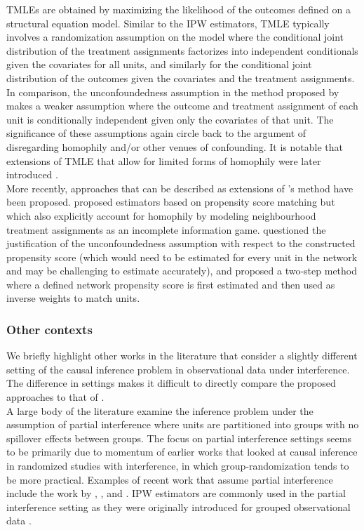 \documentclass[10pt]{article}
\begin{document}
TMLEs are obtained by maximizing the likelihood of the outcomes defined on a structural equation model. Similar to the IPW estimators, TMLE typically involves a randomization assumption \parencite{VanDerLaan:2014} on the model where the conditional joint distribution of the treatment assignments factorizes into independent conditionals given the covariates for all units, and similarly for the conditional joint distribution of the outcomes given the covariates and the treatment assignments. In comparison, the unconfoundedness assumption in the method proposed by \textcite{Forastiere:2021} makes a weaker assumption where the outcome and treatment assignment of each unit is conditionally independent given only the covariates of that unit. The significance of these assumptions again circle back to the argument of disregarding homophily and/or other venues of confounding. It is notable that extensions of TMLE that allow for limited forms of homophily were later introduced \parencite{Ogburn:2017}.
\\

More recently, approaches that can be described as extensions of \textcite{Forastiere:2021}'s method have been proposed. \textcite{Jackson:2020} proposed estimators based on propensity score matching but which also explicitly account for homophily by modeling neighbourhood treatment assignments as an incomplete information game. \textcite{Sanchez:2021} questioned the justification of the unconfoundedness assumption with respect to the constructed propensity score (which would need to be estimated for every unit in the network and may be challenging to estimate accurately), and proposed a two-step method where a defined network propensity score is first estimated and then used as inverse weights to match units.

\subsubsection{Other contexts}

We briefly highlight other works in the literature that consider a slightly different setting of the causal inference problem in observational data under interference. The difference in settings makes it difficult to directly compare the proposed approaches to that of \textcite{Forastiere:2021}.
\\

A large body of the literature examine the inference problem under the assumption of partial interference where units are partitioned into groups with no spillover effects between groups. The focus on partial interference settings seems to be primarily due to momentum of earlier works \parencite[e.g.,][]{Sobel:2006,Hudgens:2008} that looked at causal inference in randomized studies with interference, in which group-randomization tends to be more practical. Examples of recent work that assume partial interference include the work by \textcite{Liu:2019}, \textcite{Barkley:2020}, and \textcite{Qu:2021}. IPW estimators are commonly used in the partial interference setting as they were originally introduced for grouped observational data \parencite{Tchetgen:2012}.
\\
\end{document}
